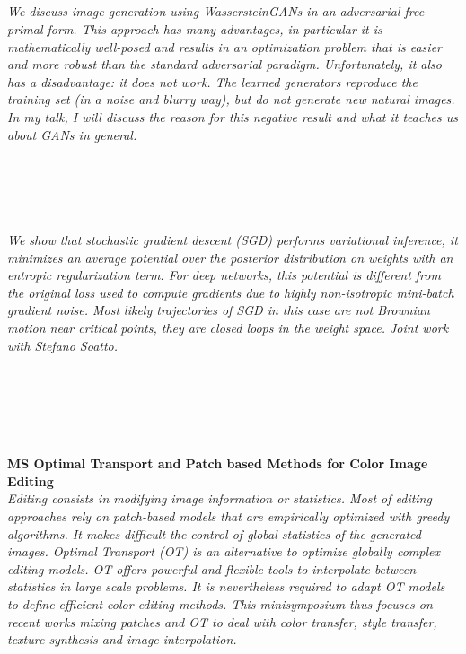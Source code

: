 \begin{multicols}{2}
        \\\\
        \\
        \\\\
        \\
        \\\\
\\
      \textit{We discuss image generation using WassersteinGANs in an adversarial-free primal form. This approach has many advantages, in particular it is mathematically well-posed and results in an optimization problem that is easier and more robust than the standard adversarial paradigm. Unfortunately, it also has a disadvantage: it does not work. The learned generators reproduce the training set (in a noise and blurry way), but do not generate new natural images. In my talk, I will discuss the reason for this negative result and what it teaches us about GANs in general.}\\
\\ 
        \\
        \\\\
\\
      \textit{We show that stochastic gradient descent (SGD) performs variational inference, it minimizes an average potential over the posterior distribution on weights with an entropic regularization term. For deep networks, this potential is different from the original loss used to compute gradients due to highly non-isotropic mini-batch gradient noise. Most likely trajectories of SGD in this case are not Brownian motion near critical points, they are closed loops in the weight space. Joint work with Stefano Soatto.}\\
\\ 
        \\
        \\\\
\\
\end{multicols}
  \noindent\textbf{MS Optimal Transport and Patch based Methods for Color Image Editing}\\
  \textit{Editing consists in modifying image information or statistics. Most of editing approaches rely on patch-based models that are empirically optimized with greedy algorithms. It makes difficult the control of global statistics of the generated images. Optimal Transport (OT) is an alternative to optimize globally complex editing models.
OT offers powerful and flexible tools to interpolate between statistics in large scale problems. It is nevertheless required to adapt OT models to define efficient color editing methods.
This minisymposium thus focuses on recent works mixing patches and OT to deal with color transfer, style transfer, texture synthesis and image interpolation.} \\
    
